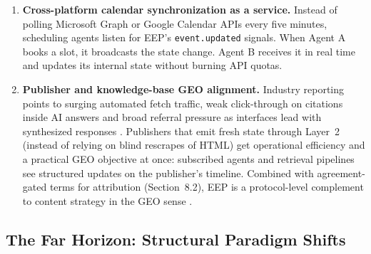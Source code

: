 \documentclass[12pt,a4paper]{article}
\begin{document}
\begin{enumerate}
    \item \textbf{Cross-platform calendar synchronization as a service.} Instead of polling Microsoft Graph or Google Calendar APIs every five minutes, scheduling agents listen for EEP's \texttt{event.updated} signals. When Agent A books a slot, it broadcasts the state change. Agent B receives it in real time and updates its internal state without burning API quotas.

    \item \textbf{Publisher and knowledge-base GEO alignment.} Industry reporting points to surging automated fetch traffic, weak click-through on citations inside AI answers and broad referral pressure as interfaces lead with synthesized responses \cite{ref34,ref35}. Publishers that emit fresh state through Layer~2 (instead of relying on blind rescrapes of HTML) get operational efficiency and a practical GEO objective at once: subscribed agents and retrieval pipelines see structured updates on the publisher's timeline. Combined with agreement-gated terms for attribution (Section~8.2), EEP is a protocol-level complement to content strategy in the GEO sense \cite{ref33}.
\end{enumerate}

\subsection{The Far Horizon: Structural Paradigm Shifts}
\end{document}
